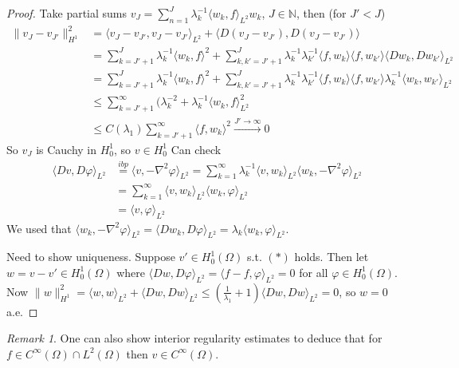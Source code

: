 \documentclass{article}
\theoremstyle{definition}
\theoremstyle{remark}
\newtheorem{rem}{Remark}
\theoremstyle{plain}
\newcommand{\NN}{\mathbb{N}}
\begin{document}
\begin{proof}
    Take partial sums $v_J=\sum_{n=1}^J\lambda_k^{-1}\langle w_k,f\rangle_{L^2}w_k$, $J\in\NN$, then (for $J'<J$) 
    \begin{align*}
        \|v_J-v_{J'}\|_{H^1}^2&=\langle v_J-v_{J'},v_J-v_{J'}\rangle_{L^2}+\langle D(v_J-v_{J'}),D(v_J-{v_{J'}})\rangle\\
        &=\sum_{k=J'+1}^J\lambda_k^{-1}\langle w_k,f\rangle^2+\sum_{k,k'=J'+1}^J\lambda_k^{-1}\lambda_{k'}^{-1}\langle f,w_k\rangle\langle f,w_{k'}\rangle\langle Dw_k,Dw_{k'}\rangle_{L^2}\\
        &=\sum_{k=J'+1}^J\lambda_k^{-1}\langle w_k,f\rangle^2+\sum_{k,k'=J'+1}^J\lambda_k^{-1}\lambda_{k'}^{-1}\langle f,w_k\rangle\langle f,w_{k'}\rangle\lambda_k^{-1}\langle w_k,w_{k'}\rangle_{L^2}\\
        &\le \sum_{k=J'+1}^\infty(\lambda_k^{-2}+\lambda_k^{-1}\langle w_k,f\rangle_{L^2}^2\\
        &\le C(\lambda_1)\sum_{k=J'+1}^\infty\langle f,w_k\rangle^2\overset{J'\to\infty}{\longrightarrow}0
    \end{align*}
    So $v_J$ is Cauchy in $H_0^1$, so $v\in H_0^1$
    Can check
    \begin{align*}
        \langle Dv,D\varphi\rangle_{L^2}&\overset{ibp}{=}\langle v,-\nabla^2\varphi\rangle_{L^2}=\sum_{k=1}^\infty\lambda_k^{-1}\langle v,w_k\rangle_{L^2}\langle w_{k},-\nabla^2\varphi\rangle_{L^2}\\
        &=\sum_{k=1}^\infty\langle v,w_k\rangle_{L^2}\langle w_k,\varphi\rangle_{L^2}\\
        &=\langle v,\varphi\rangle_{L^2}
    \end{align*}
    We used that $\langle w_k,-\nabla^2\varphi\rangle_{L^2}=\langle Dw_k,D\varphi\rangle_{L^2}=\lambda_k\langle w_k,\varphi\rangle_{L^2}$.

    Need to show uniqueness. Suppose $v'\in H_0^1(\Omega)$ s.t. $(\ast)$ holds. Then let $w=v-v'\in H_0^1(\Omega)$ where $\langle Dw, D\varphi\rangle_{L^2}=\langle f-f,\varphi\rangle_{L^2}=0$ for all $\varphi\in H_0^1(\Omega)$.
    Now $\|w\|^2_{H^1}=\langle w,w\rangle_{L^2}+\langle Dw,Dw\rangle_{L^2}\le (\frac{1}{\lambda_1}+1)\langle Dw,Dw\rangle_{L^2}=0$, so $w=0$ a.e.
\end{proof}
\begin{rem}
    One can also show interior regularity estimates to deduce that for $f\in C^\infty(\Omega)\cap L^2(\Omega)$ then $v\in C^\infty(\Omega)$.
\end{rem}
\end{document}
